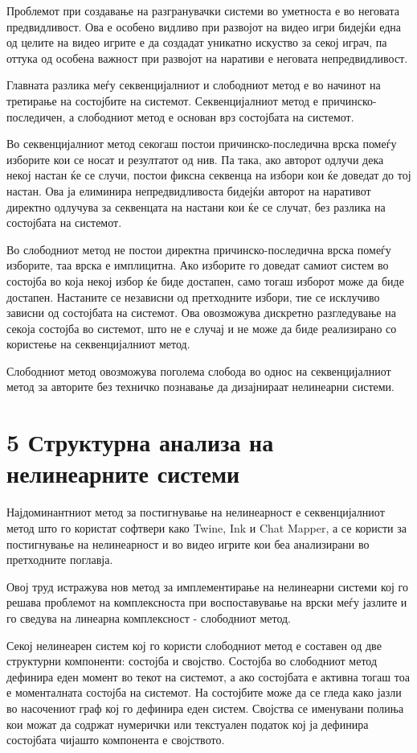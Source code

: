 Проблемот при создавање на разгранувачки системи во уметноста е во неговата предвидливост. Ова е особено видливо при развојот на видео игри бидејќи една од целите на видео игрите е да создадат уникатно искуство за секој играч, па оттука од особена важност при развојот на наративи е неговата непредвидливост.

Главната разлика меѓу секвенцијалниот и слободниот метод е во начинот на третирање на состојбите на системот. Секвенцијалниот метод е причинско-последичен, а слободниот метод е основан врз состојбата на системот.

Во секвенцијалниот метод секогаш постои причинско-последична врска помеѓу изборите кои се носат и резултатот од нив. Па така, ако авторот одлучи дека некој настан ќе се случи, постои фиксна секвенца на избори кои ќе доведат до тој настан. Ова ја елиминира непредвидливоста бидејќи авторот на наративот директно одлучува за секвенцата на настани кои ќе се случат, без разлика на состојбата на системот.

Во слободниот метод не постои директна причинско-последична врска помеѓу изборите, таа врска е имплицитна. Ако изборите го доведат самиот систем во состојба во која некој избор ќе биде достапен, само тогаш изборот може да биде достапен. Настаните се независни од претходните избори, тие се исклучиво зависни од состојбата на системот. Ова овозможува дискретно разгледување на секоја состојба во системот, што не е случај и не може да биде реализирано со користење на секвенцијалниот метод.

Слободниот метод овозможува поголема слобода во однос на секвенцијалниот метод за авторите без техничко познавање да дизајнираат нелинеарни системи.

\section{5 Структурна анализа на нелинеарните системи}

Најдоминантниот метод за постигнување на нелинеарност е секвенцијалниот метод што го користат софтвери како Twine, Ink и Chat Mapper, а се користи за постигнување на нелинеарност и во видео игрите кои беа анализирани во претходните поглавја.

Овој труд истражува нов метод за имплементирање на нелинеарни системи кој го решава проблемот на комплексноста при воспоставување на врски меѓу јазлите и го сведува на линеарна комплексност - слободниот метод.

Секој нелинеарен систем кој го користи слободниот метод е составен од две структурни компоненти: состојба и својство. Состојба во слободниот метод дефинира еден момент во текот на системот, а ако состојбата е активна тогаш тоа е моменталната состојба на системот. На состојбите може да се гледа како јазли во насочениот граф кој го дефинира еден систем. Својства се именувани полиња кои можат да содржат нумерички или текстуален податок кој ја дефинира состојбата чијашто компонента е својството.

